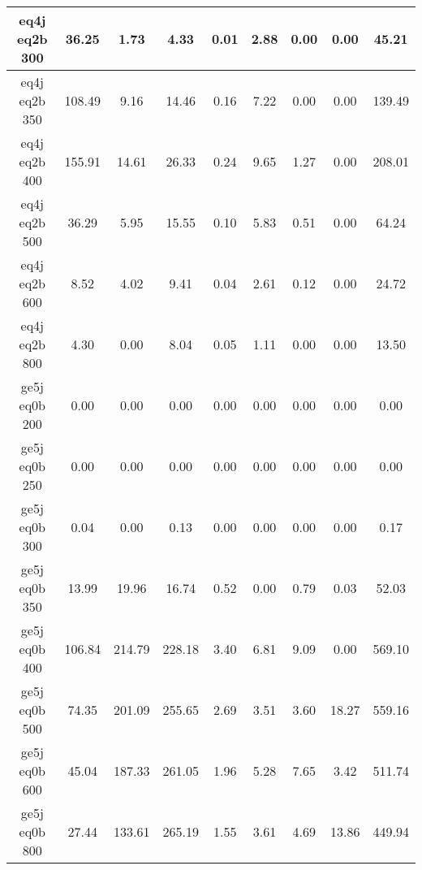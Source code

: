 \begin{longtable}{| c | c | c | c | c | c | c | c | c  | }
eq4j eq2b 300 & 36.25 & 1.73 & 4.33 & 0.01 & 2.88 & 0.00 & 0.00 & 45.21\\ \hline 
eq4j eq2b 350 & 108.49 & 9.16 & 14.46 & 0.16 & 7.22 & 0.00 & 0.00 & 139.49\\ \hline 
eq4j eq2b 400 & 155.91 & 14.61 & 26.33 & 0.24 & 9.65 & 1.27 & 0.00 & 208.01\\ \hline 
eq4j eq2b 500 & 36.29 & 5.95 & 15.55 & 0.10 & 5.83 & 0.51 & 0.00 & 64.24\\ \hline 
eq4j eq2b 600 & 8.52 & 4.02 & 9.41 & 0.04 & 2.61 & 0.12 & 0.00 & 24.72\\ \hline 
eq4j eq2b 800 & 4.30 & 0.00 & 8.04 & 0.05 & 1.11 & 0.00 & 0.00 & 13.50\\ \hline 
ge5j eq0b 200 & 0.00 & 0.00 & 0.00 & 0.00 & 0.00 & 0.00 & 0.00 & 0.00\\ \hline 
ge5j eq0b 250 & 0.00 & 0.00 & 0.00 & 0.00 & 0.00 & 0.00 & 0.00 & 0.00\\ \hline 
ge5j eq0b 300 & 0.04 & 0.00 & 0.13 & 0.00 & 0.00 & 0.00 & 0.00 & 0.17\\ \hline 
ge5j eq0b 350 & 13.99 & 19.96 & 16.74 & 0.52 & 0.00 & 0.79 & 0.03 & 52.03\\ \hline 
ge5j eq0b 400 & 106.84 & 214.79 & 228.18 & 3.40 & 6.81 & 9.09 & 0.00 & 569.10\\ \hline 
ge5j eq0b 500 & 74.35 & 201.09 & 255.65 & 2.69 & 3.51 & 3.60 & 18.27 & 559.16\\ \hline 
ge5j eq0b 600 & 45.04 & 187.33 & 261.05 & 1.96 & 5.28 & 7.65 & 3.42 & 511.74\\ \hline 
ge5j eq0b 800 & 27.44 & 133.61 & 265.19 & 1.55 & 3.61 & 4.69 & 13.86 & 449.94\\ \hline 
    \hline 
    \hline 
\end{longtable}
